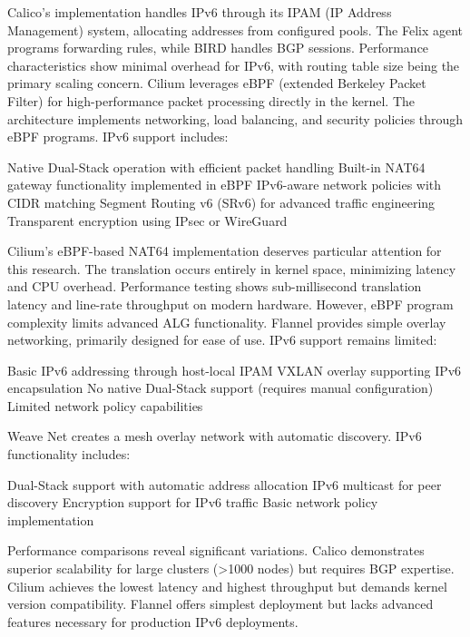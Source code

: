 Calico's implementation handles IPv6 through its IPAM (IP Address Management) system, allocating addresses from configured pools. The Felix agent programs forwarding rules, while BIRD handles BGP sessions. Performance characteristics show minimal overhead for IPv6, with routing table size being the primary scaling concern.
Cilium leverages eBPF (extended Berkeley Packet Filter) for high-performance packet processing directly in the kernel. The architecture implements networking, load balancing, and security policies through eBPF programs. IPv6 support includes:

Native Dual-Stack operation with efficient packet handling
Built-in NAT64 gateway functionality implemented in eBPF
IPv6-aware network policies with CIDR matching
Segment Routing v6 (SRv6) for advanced traffic engineering
Transparent encryption using IPsec or WireGuard

Cilium's eBPF-based NAT64 implementation deserves particular attention for this research. The translation occurs entirely in kernel space, minimizing latency and CPU overhead. Performance testing shows sub-millisecond translation latency and line-rate throughput on modern hardware. However, eBPF program complexity limits advanced ALG functionality.
Flannel provides simple overlay networking, primarily designed for ease of use. IPv6 support remains limited:

Basic IPv6 addressing through host-local IPAM
VXLAN overlay supporting IPv6 encapsulation
No native Dual-Stack support (requires manual configuration)
Limited network policy capabilities

Weave Net creates a mesh overlay network with automatic discovery. IPv6 functionality includes:

Dual-Stack support with automatic address allocation
IPv6 multicast for peer discovery
Encryption support for IPv6 traffic
Basic network policy implementation

Performance comparisons reveal significant variations. Calico demonstrates superior scalability for large clusters (>1000 nodes) but requires BGP expertise. Cilium achieves the lowest latency and highest throughput but demands kernel version compatibility. Flannel offers simplest deployment but lacks advanced features necessary for production IPv6 deployments.

